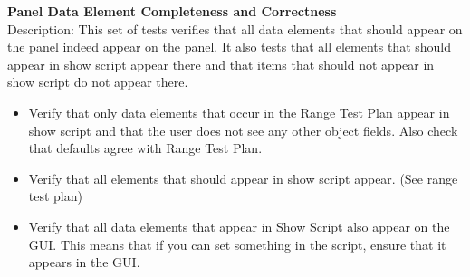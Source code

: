 %
\noindent\textbf{Panel Data Element Completeness and Correctness}\\

\noindent Description: This set of tests verifies that all data
elements that should appear on the panel indeed appear on the panel.
It also tests that all elements that should appear in show script
appear there and that items that should not appear in show script do
not appear there.

\begin{itemize}
    \item Verify that only data elements that occur in the Range
    Test Plan appear in show script and that the user does not see
    any other object fields.   Also check that defaults agree with
    Range Test Plan.
    \item Verify that all elements that should appear in show script
    appear.  (See range test plan)
    \item  Verify that all data elements
    that appear in Show Script also appear on the GUI.  This
    means that if you can set something in the script, ensure that it
    appears in the GUI.
\end{itemize}
\vspace{.25 in}
